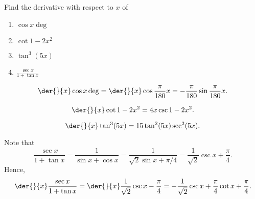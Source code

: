 \begin{problem}
    Find the derivative with respect to $x$ of
        
    \begin{enumerate}
        \item $\cos x\deg$
        \item $\cot{1-2x^2}$
        \item $\tan^3 (5x)$
        \item $\frac{\sec x}{1 + \tan x}$
    \end{enumerate}
\end{problem}
\begin{solution}
    \begin{ppart}
        \[\der{}{x} \cos x\deg = \der{}{x} \cos{\frac{\pi}{180} x} = -\frac{\pi}{180} \sin{\frac{\pi}{180} x}.\]
    \end{ppart}
    \begin{ppart}
        \[\der{}{x} \cot{1-2x^2} = 4x\csc{1-2x^2}.\]
    \end{ppart}
    \begin{ppart}
        \[\der{}{x} \tan^3 (5x) = 15\tan^2(5x)\sec^2(5x).\]
    \end{ppart}
    \begin{ppart}
        Note that \[\frac{\sec x}{1 + \tan x} = \frac{1}{\sin x + \cos x} = \frac1{\sqrt2 \sin{x + \pi/4}} = \frac1{\sqrt2} \csc{x + \frac\pi4}.\] Hence, \[\der{}{x} \frac{\sec x}{1 + \tan x} = \der{}{x} \frac1{\sqrt2} \csc{x - \frac\pi4} = -\frac1{\sqrt2} \csc{x + \frac\pi4} \cot{x + \frac\pi4}.\]
    \end{ppart}
\end{solution}

